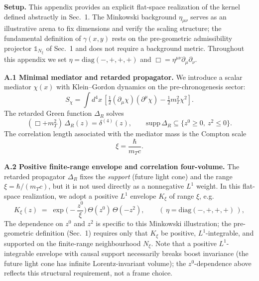 \documentclass[12pt,a4paper]{article}
\numberwithin{equation}{section}
\begin{document}
\noindent\textbf{Setup.}
This appendix provides an explicit flat-space realization of the kernel defined abstractly in Sec.~1. The Minkowski background $\eta_{\mu\nu}$ serves as an illustrative arena to fix dimensions and verify the scaling structure; the fundamental definition of $\gamma(x,y)$ rests on the pre-geometric admissibility projector $\mathbb{1}_{N_\xi}$ of Sec.~1 and does not require a background metric. Throughout this appendix we set \(\eta=\mathrm{diag}(-,+,+,+)\) and \(\Box=\eta^{\mu\nu}\partial_\mu\partial_\nu\).

\vspace{0.3cm}
\noindent\textbf{A.1 Minimal mediator and retarded propagator.}
We introduce a scalar mediator $\chi(x)$ with Klein--Gordon dynamics on the pre-chronogenesis sector:
\begin{equation}
S_\chi=\!\int d^4x\,\left[\tfrac12(\partial_\mu \chi)(\partial^\mu \chi)-\tfrac12 m_T^2 \chi^2\right].
\tag{A.1}
\end{equation}
The retarded Green function \(\Delta_R\) solves
\begin{equation}
(\Box+m_T^2)\,\Delta_R(z)=\delta^{(4)}(z),\qquad \mathrm{supp}\,\Delta_R\subseteq\{z^0\ge 0,\ z^2\le 0\}.
\tag{A.2}
\end{equation}
The correlation length associated with the mediator mass is the Compton scale
\begin{equation}
\xi=\frac{\hbar}{m_T c}.
\tag{A.3}\label{eq:scales-mediatormass}
\end{equation}

\vspace{0.3cm}
\noindent\textbf{A.2 Positive finite-range envelope and correlation four-volume.}
The retarded propagator $\Delta_R$ fixes the \emph{support} (future light cone) and the
range $\xi=\hbar/(m_Tc)$, but it is not used directly as a nonnegative $L^1$ weight.
In this flat-space realization, we adopt a positive $L^1$ envelope $K_\xi$ of range $\xi$, e.g.
\begin{equation}
K_\xi(z)\;=\;\exp\!\Big(-\frac{z^0}{\xi}\Big)\,\Theta(z^0)\,\Theta(-z^2),
\qquad (\,\eta=\mathrm{diag}(-,+,+,+)\,),
\tag{A.4}
\end{equation}
The dependence on $z^0$ and $z^2$ is specific to this Minkowski illustration; the pre-geometric definition (Sec.~1) requires only that $K_\xi$ be positive, $L^1$-integrable, and supported on the finite-range neighbourhood $N_\xi$. Note that a positive $L^1$-integrable envelope with causal support necessarily breaks boost invariance (the future light cone has infinite Lorentz-invariant volume); the $z^0$-dependence above reflects this structural requirement, not a frame choice.
\end{document}
